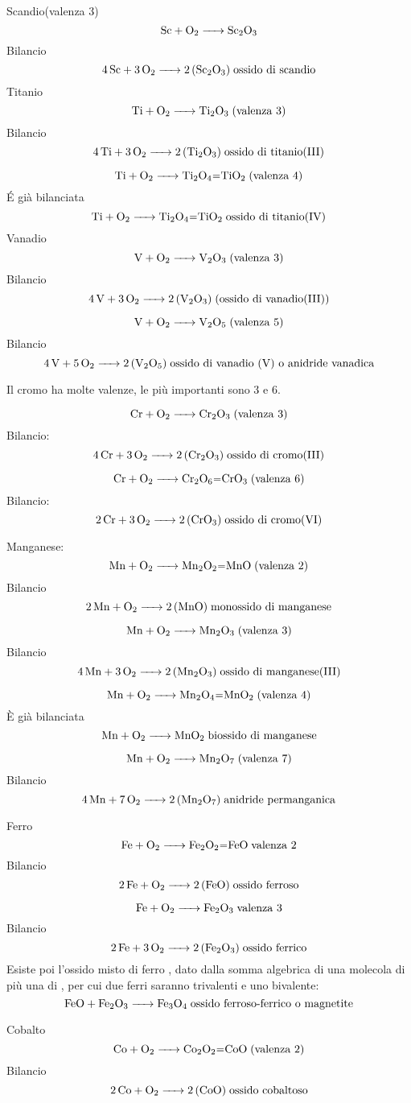 Scandio(valenza 3)
$$\ce{ Sc + O_2 -> Sc_2O_3}$$ Bilancio
$$\ce{4 Sc + 3O_2 -> 2 (Sc_2O_3)} \; \text{ossido di scandio}$$
Titanio
$$\ce{ Ti + O_2 -> Ti_2O_3} \; \text{(valenza 3)}$$ Bilancio
$$\ce{4 Ti + 3 O_2 -> 2 (Ti_2O_3)} \; \text{ossido di titanio(III)}$$

$$\ce{ Ti + O_2 -> Ti_2O_4=TiO_2} \; \text{(valenza 4)}$$
É già bilanciata
$$\ce{ Ti + O_2 -> Ti_2O_4=TiO_2} \; \text{ossido di titanio(IV)}$$
Vanadio
$$\ce{ V + O_2 -> V_2O_3} \; \text{(valenza 3)}$$ Bilancio
$$\ce{ 4 V + 3 O_2 -> 2 (V_2O_3)} \; \text{(ossido di vanadio(III))}$$

$$\ce{V + O_2 -> V_2O_5} \; \text{(valenza 5)}$$Bilancio
$$\ce{ 4 V + 5 O_2 -> 2 (V_2O_5)} \;  \text{ossido di vanadio (V) o anidride vanadica}$$

Il cromo ha molte valenze, le più importanti sono 3 e 6.

$$\ce{ Cr + O_2 -> Cr_2O_3} \; \text{(valenza 3)}$$ Bilancio:
$$ \ce{ 4 Cr + 3 O_2 -> 2 (Cr_2O_3)}\; \text{ossido di cromo(III)}$$

$$\ce{ Cr + O_2 -> Cr_2O_6=CrO_3} \; \text{(valenza 6)}$$ Bilancio:
$$\ce{ 2 Cr + 3 O_2 -> 2 (CrO_3)}\; \text{ossido di cromo(VI)}$$

Manganese:
\\
$$\ce{ Mn + O_2 -> Mn_2O_2=MnO} \; \text{(valenza 2)}$$ Bilancio
$$\ce{ 2 Mn + O_2 -> 2 (MnO)} \; \text{monossido di manganese}$$

$$\ce{ Mn + O_2 -> Mn_2O_3} \; \text{(valenza 3)}$$ Bilancio
$$\ce{ 4 Mn + 3O_2 -> 2 (Mn_2O_3)} \; \text{ossido di manganese(III)}$$

$$\ce{ Mn + O_2 -> Mn_2O_4=MnO_2} \; \text{(valenza 4)}$$ È già bilanciata
$$\ce{ Mn + O_2 -> MnO_2} \; \text{biossido di manganese}$$ 

$$\ce{ Mn + O_2 -> Mn_2O_7} \; \text{(valenza 7)}$$ Bilancio
$$\ce{ 4 Mn + 7O_2 -> 2 (Mn_2O_7)} \; \text{anidride permanganica}$$

Ferro 
$$\ce{ Fe + O_2 -> Fe_2O_2=FeO} \; \text{valenza 2}$$ Bilancio
$$\ce{ 2 Fe + O_2 -> 2 (FeO)} \; \text{ossido ferroso}$$

$$\ce{ Fe + O_2 -> Fe_2O_3} \; \text{valenza 3}$$ Bilancio
$$\ce{ 2 Fe + 3O_2 -> 2 (Fe_2O_3)} \; \text{ossido ferrico}$$
Esiste poi l'ossido misto di ferro , dato dalla somma algebrica di una molecola di  più una di , per cui due ferri saranno trivalenti e uno bivalente:
$$\ce{FeO + Fe_2O_3 -> Fe_3O_4} \; \text{ossido ferroso-ferrico o magnetite}$$

Cobalto
$$\ce{ Co + O_2 -> Co_2O_2=CoO} \; \text{(valenza 2)}$$ Bilancio
$$\ce{ 2 Co + O_2 -> 2 (CoO)} \; \text{ossido cobaltoso}$$

